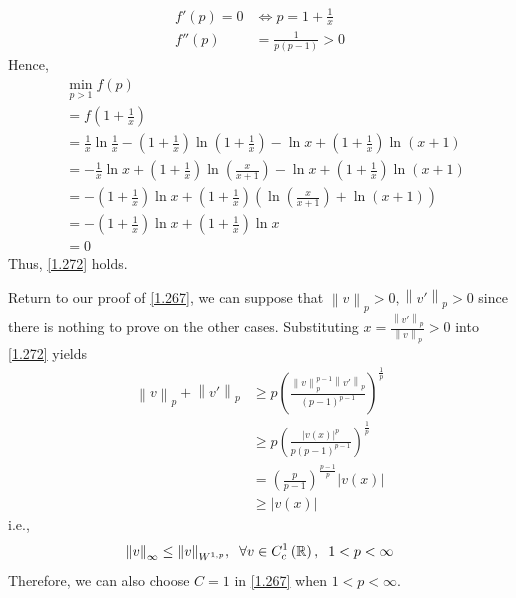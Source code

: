 \documentclass[a4paper,oneside]{article}
\numberwithin{equation}{section}
\begin{document}
\begin{enumerate}
\begin{align}
f'\left( p \right) = 0 &\Leftrightarrow p = 1 + \frac{1}{x}\\
f''\left( p \right) &= \frac{1}{{p\left( {p - 1} \right)}} > 0
\end{align}
Hence, 
\begin{align}
&\mathop {\min }\limits_{p > 1} f\left( p \right)\\
 &= f\left( {1 + \frac{1}{x}} \right)\\
& = \frac{1}{x}\ln \frac{1}{x} - \left( {1 + \frac{1}{x}} \right)\ln \left( {1 + \frac{1}{x}} \right) - \ln x + \left( {1 + \frac{1}{x}} \right)\ln \left( {x + 1} \right)\\
& =  - \frac{1}{x}\ln x + \left( {1 + \frac{1}{x}} \right)\ln \left( {\frac{x}{{x + 1}}} \right) - \ln x + \left( {1 + \frac{1}{x}} \right)\ln \left( {x + 1} \right)\\
& =  - \left( {1 + \frac{1}{x}} \right)\ln x + \left( {1 + \frac{1}{x}} \right)\left( {\ln \left( {\frac{x}{{x + 1}}} \right) + \ln \left( {x + 1} \right)} \right)\\
& =  - \left( {1 + \frac{1}{x}} \right)\ln x + \left( {1 + \frac{1}{x}} \right)\ln x\\
 &= 0
\end{align}
Thus, \eqref{1.272} holds. 

Return to our proof of \eqref{1.267}, we can suppose that ${\left\| v \right\|_p} > 0,{\left\| {v'} \right\|_p} > 0$ since there is nothing to prove on the other cases. Substituting $x = \frac{{{{\left\| {v'} \right\|}_p}}}{{{{\left\| v \right\|}_p}}} >0$ into \eqref{1.272} yields
\begin{align}
{\left\| v \right\|_p} + {\left\| {v'} \right\|_p} &\ge p{\left( {\frac{{\left\| v \right\|_p^{p - 1}{{\left\| {v'} \right\|}_p}}}{{{{\left( {p - 1} \right)}^{p - 1}}}}} \right)^{\frac{1}{p}}}\\
& \ge p{\left( {\frac{{{{\left| {v\left( x \right)} \right|}^p}}}{{p{{\left( {p - 1} \right)}^{p - 1}}}}} \right)^{\frac{1}{p}}}\\
& = {\left( {\frac{p}{{p - 1}}} \right)^{\frac{{p - 1}}{p}}}\left| {v\left( x \right)} \right|\\
& \ge \left| {v\left( x \right)} \right|
\end{align}
i.e., 
\begin{align}
{\left\| v \right\|_\infty } \le {\left\| v \right\|_{{W^{1,p}}}},\hspace{0.2cm}\forall v \in C_c^1\left( \mathbb{R} \right),\hspace{0.2cm} 1<p<\infty
\end{align}
Therefore, we can also choose $C=1$ in \eqref{1.267} when $1<p< \infty$.
\end{enumerate}
\end{document}
